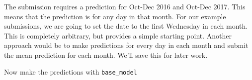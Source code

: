 \documentclass[]{book}
\newenvironment{Shaded}{\begin{snugshade}}{\end{snugshade}}
\newcommand{\KeywordTok}[1]{\textcolor[rgb]{0.13,0.29,0.53}{\textbf{#1}}}
\newcommand{\DecValTok}[1]{\textcolor[rgb]{0.00,0.00,0.81}{#1}}
\newcommand{\StringTok}[1]{\textcolor[rgb]{0.31,0.60,0.02}{#1}}
\newcommand{\CommentTok}[1]{\textcolor[rgb]{0.56,0.35,0.01}{\textit{#1}}}
\newcommand{\OperatorTok}[1]{\textcolor[rgb]{0.81,0.36,0.00}{\textbf{#1}}}
\newcommand{\NormalTok}[1]{#1}
\theoremstyle{definition}
\theoremstyle{definition}
\theoremstyle{definition}
\theoremstyle{remark}
\begin{document}
The submission requires a prediction for Oct-Dec 2016 and Oct-Dec 2017.
This means that the prediction is for any day in that month. For our
example submissions, we are going to set the date to the first Wednesday
in each month. This is completely arbitrary, but provides a simple
starting point. Another approach would be to make predictions for every
day in each month and submit the mean prediction for each month. We'll
save this for later work.

\begin{Shaded}
\end{Shaded}

Now make the predictions with \texttt{base\_model}
\end{document}

